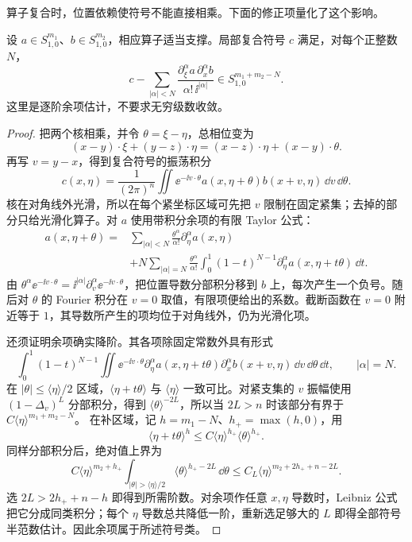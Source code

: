 算子复合时，位置依赖使符号不能直接相乘。下面的修正项量化了这个影响。

\begin{proposition}[伪微分算子的复合符号]
设 $a\in S^{m_1}_{1,0}$、$b\in S^{m_2}_{1,0}$，相应算子适当支撑。局部复合符号 $c$ 满足，对每个正整数 $N$，
\begin{equation}
c-\sum_{|\alpha|<N}
\frac{\partial_\xi^\alpha a\,\partial_x^\alpha b}
{\alpha!\,\ii^{|\alpha|}}
\in S^{m_1+m_2-N}_{1,0}.
\label{eq:math-dist-symbol-composition}
\end{equation}
这里是逐阶余项估计，不要求无穷级数收敛。
\end{proposition}
\begin{proof}
把两个核相乘，并令 $\theta=\xi-\eta$，总相位变为
\[
(x-y)\cdot\xi+(y-z)\cdot\eta
=(x-z)\cdot\eta+(x-y)\cdot\theta.
\]
再写 $v=y-x$，得到复合符号的振荡积分
\[
c(x,\eta)=\frac1{(2\pi)^n}
\iint\ee^{-\ii v\cdot\theta}
a(x,\eta+\theta)b(x+v,\eta)\,\dd v\,\dd\theta.
\]
核在对角线外光滑，所以在每个紧坐标区域可先把 $v$ 限制在固定紧集；去掉的部分只给光滑化算子。对 $a$ 使用带积分余项的有限 Taylor 公式：
\begin{align*}
a(x,\eta+\theta)
={}&\sum_{|\alpha|<N}\frac{\theta^\alpha}{\alpha!}
\partial_\eta^\alpha a(x,\eta)\\
&+N\sum_{|\alpha|=N}\frac{\theta^\alpha}{\alpha!}
\int_0^1(1-t)^{N-1}
\partial_\eta^\alpha a(x,\eta+t\theta)\,\dd t.
\end{align*}
由 $\theta^\alpha\ee^{-\ii v\cdot\theta}=\ii^{|\alpha|}\partial_v^\alpha\ee^{-\ii v\cdot\theta}$，把位置导数分部积分移到 $b$ 上，每次产生一个负号。随后对 $\theta$ 的 Fourier 积分在 $v=0$ 取值，有限项便给出的系数。截断函数在 $v=0$ 附近等于 $1$，其导数所产生的项均位于对角线外，仍为光滑化项。

还须证明余项确实降阶。其各项除固定常数外具有形式
\[
\int_0^1(1-t)^{N-1}\iint\ee^{-\ii v\cdot\theta}
\partial_\eta^\alpha a(x,\eta+t\theta)
\partial_x^\alpha b(x+v,\eta)\,\dd v\,\dd\theta\,\dd t,
\qquad |\alpha|=N.
\]
在 $|\theta|\le\langle\eta\rangle/2$ 区域，$\langle\eta+t\theta\rangle$ 与 $\langle\eta\rangle$ 一致可比。对紧支集的 $v$ 振幅使用 $(1-\Delta_v)^L$ 分部积分，得到 $\langle\theta\rangle^{-2L}$，所以当 $2L>n$ 时该部分有界于 $C\langle\eta\rangle^{m_1+m_2-N}$。
在补区域，记 $h=m_1-N$、$h_+=\max(h,0)$，用
\[
\langle\eta+t\theta\rangle^h
\le C\langle\eta\rangle^{h_+}\langle\theta\rangle^{h_+}.
\]
同样分部积分后，绝对值上界为
\[
C\langle\eta\rangle^{m_2+h_+}
\int_{|\theta|>\langle\eta\rangle/2}
\langle\theta\rangle^{h_+-2L}\,\dd\theta
\le C_L\langle\eta\rangle^{m_2+2h_++n-2L}.
\]
选 $2L>2h_++n-h$ 即得到所需阶数。对余项作任意 $x,\eta$ 导数时，Leibniz 公式把它分成同类积分；每个 $\eta$ 导数总共降低一阶，重新选足够大的 $L$ 即得全部符号半范数估计。因此余项属于所述符号类。
\end{proof}

